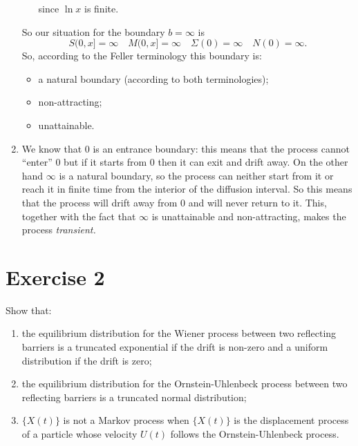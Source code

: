 \documentclass[12pt]{article}
\begin{document}
\begin{enumerate}
\begin{itemize}
\begin{equation*}
			\end{equation*}
			since $\ln x$ is finite.
		\end{itemize}
		So our situation for the boundary $b=\infty$ is
		\begin{equation*}
			S(0,x]=\infty\quad M(0,x]=\infty\quad \Sigma(0)=\infty \quad N(0)=\infty.
		\end{equation*}
		So, according to the Feller terminology this boundary is:
		\begin{itemize}[$\diamond$]
			\item a natural boundary (according to both terminologies);
			\item non-attracting;
			\item unattainable.
		\end{itemize}
		\item We know that $0$ is an entrance boundary: this means that the process cannot ``enter'' 0 but if it starts from 0 then it can exit and drift away. On the other hand $\infty$ is a natural boundary, so the process can neither start from it or reach it in finite time from the interior of the diffusion interval. 
		So this means that the process will drift away from 0 and will never return to it. This, together with the fact that $\infty$ is unattainable and non-attracting, makes the process \emph{transient.}
	\end{enumerate}
	\section*{Exercise 2}
	Show that:
	\begin{enumerate}
		\item the equilibrium distribution for the Wiener process between two reflecting barriers is a truncated exponential if the drift is non-zero and a uniform distribution if the drift is zero;
		\item the equilibrium distribution for the Ornstein-Uhlenbeck process between two reflecting barriers is a truncated normal distribution;
		\item $\{X(t)\}$ is not a Markov process when $\{X(t)\}$ is the displacement process of a particle whose velocity $U(t)$ follows the Ornstein-Uhlenbeck process.
	\end{enumerate}
	
\end{document}
